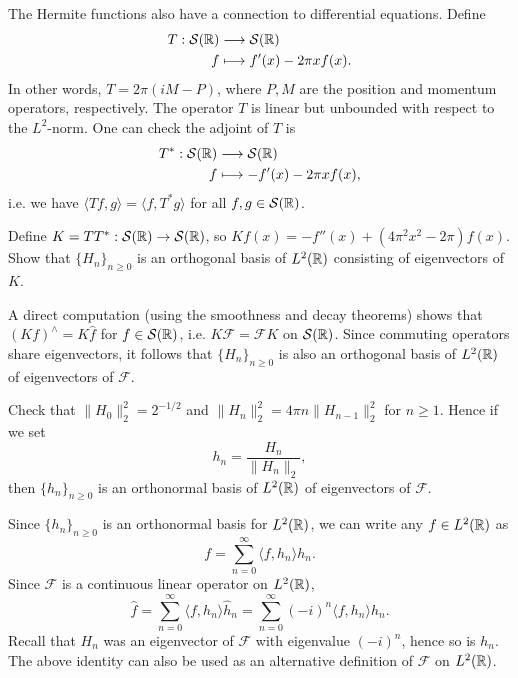 \begin{remark}
  The Hermite functions also have a connection
  to differential equations. Define
  \begin{align*}
    T : \mathcal{S}(\mathbb{R}) &\longrightarrow \mathcal{S}(\mathbb{R}) \\
    f &\longmapsto f'(x) - 2\pi x f(x).
  \end{align*}
  In other words, $T = 2\pi (i M - P)$, where
  $P, M$ are the position and momentum operators,
  respectively. The operator $T$ is
  linear but unbounded with respect to the $L^2$-norm.
  One can check the adjoint of $T$ is
  \begin{align*}
    T^* : \mathcal{S}(\mathbb{R}) &\longrightarrow \mathcal{S}(\mathbb{R}) \\
    f &\longmapsto -f'(x) - 2\pi x f(x),
  \end{align*}
  i.e. we have
  $\langle Tf, g \rangle = \langle f, T^* g \rangle$
  for all $f, g \in \mathcal{S}(\mathbb{R})$.
\end{remark}

\begin{exercise}
  Define $K = T T^* : \mathcal{S}(\mathbb{R}) \to \mathcal{S}(\mathbb{R})$, so
  $Kf(x) = -f''(x) + (4\pi^2 x^2 - 2\pi)f(x)$.
  Show that $\{H_n\}_{n \ge 0}$ is an orthogonal
  basis of $L^2(\mathbb{R})$ consisting of eigenvectors of $K$.
\end{exercise}

\begin{remark}
  A direct computation (using the smoothness and
  decay theorems) shows that
  $(Kf)^\wedge = K \widehat{f}$ for
  $f \in \mathcal{S}(\mathbb{R})$, i.e.
  $K\mathcal{F} = \mathcal{F} K$ on $\mathcal{S}(\mathbb{R})$.
  Since
  commuting operators share eigenvectors, it follows
  that $\{H_n\}_{n \ge 0}$ is also an orthogonal
  basis of $L^2(\mathbb{R})$ of eigenvectors of $\mathcal{F}$.
\end{remark}

\begin{exercise}
  Check that $\|H_0\|_2^2 = 2^{-1 / 2}$ and
  $\|H_n\|_2^2 = 4\pi n \|H_{n - 1}\|_2^2$
  for $n \ge 1$. Hence if we set
  \[
    h_n = \frac{H_n}{\|H_n\|_2},
  \]
  then $\{h_n\}_{n \ge 0}$
  is an orthonormal basis of $L^2(\mathbb{R})$ of eigenvectors
  of $\mathcal{F}$.
\end{exercise}

\begin{remark}
  Since $\{h_n\}_{n \ge 0}$ is an orthonormal
  basis for $L^2(\mathbb{R})$, we can write
  any $f \in L^2(\mathbb{R})$ as
  \[
    f = \sum_{n = 0}^\infty \langle f, h_n \rangle h_n.
  \]
  Since $\mathcal{F}$ is a continuous
  linear operator on $L^2(\mathbb{R})$,
  \[
    \widehat{f} = \sum_{n = 0}^\infty \langle f, h_n \rangle \widehat{h}_n
    = \sum_{n = 0}^\infty (-i)^n \langle f, h_n \rangle h_n.
  \]
  Recall that $H_n$ was an eigenvector of
  $\mathcal{F}$ with eigenvalue $(-i)^n$, hence
  so is $h_n$. The above identity can also be used as an
  alternative definition
  of $\mathcal{F}$ on $L^2(\mathbb{R})$.
\end{remark}

